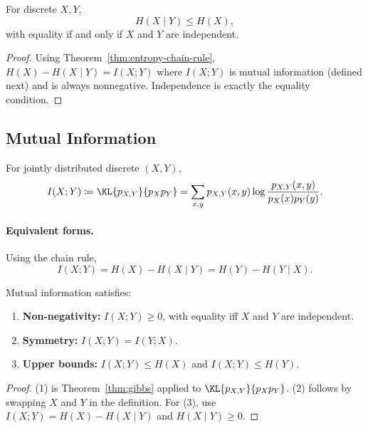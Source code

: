 \begin{theorem}
\label{thm:conditioning-reduces-entropy}
For discrete $X,Y$,
\begin{equation}
    H(X\mid Y)\le H(X),
\end{equation}
with equality if and only if $X$ and $Y$ are independent.
\end{theorem}
\begin{proof}
Using Theorem~\ref{thm:entropy-chain-rule},
\(
H(X)-H(X\mid Y) = I(X;Y)
\)
where $I(X;Y)$ is mutual information (defined next) and is always nonnegative.
Independence is exactly the equality condition.
\end{proof}

\subsection{Mutual Information}
\label{sec:entropy-mi}

\begin{definition}
\label{def:mi}
For jointly distributed discrete $(X,Y)$,
\begin{equation}
    I(X;Y)
    \coloneqq \KL{p_{X,Y}}{p_Xp_Y}
    = \sum_{x,y} p_{X,Y}(x,y)\log\frac{p_{X,Y}(x,y)}{p_X(x)p_Y(y)}.
\end{equation}
\end{definition}

\paragraph{Equivalent forms.}
Using the chain rule,
\begin{equation}
    I(X;Y)=H(X)-H(X\mid Y)=H(Y)-H(Y\mid X).
\end{equation}

\begin{theorem}
\label{thm:mi-basic}
Mutual information satisfies:
\begin{enumerate}[leftmargin=2em]
    \item \textbf{Non-negativity:} $I(X;Y)\ge 0$, with equality iff $X$ and $Y$ are independent.
    \item \textbf{Symmetry:} $I(X;Y)=I(Y;X)$.
    \item \textbf{Upper bounds:} $I(X;Y)\le H(X)$ and $I(X;Y)\le H(Y)$.
\end{enumerate}
\end{theorem}
\begin{proof}
(1) is Theorem~\ref{thm:gibbs} applied to $\KL{p_{X,Y}}{p_Xp_Y}$.
(2) follows by swapping $X$ and $Y$ in the definition.
For (3), use $I(X;Y)=H(X)-H(X\mid Y)$ and $H(X\mid Y)\ge 0$.
\end{proof}

